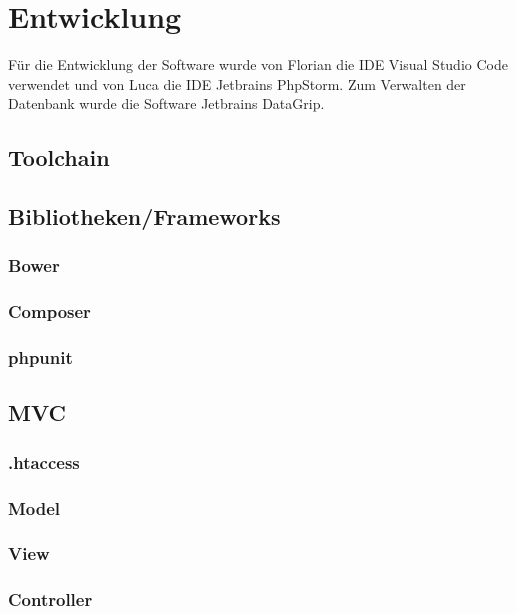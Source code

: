\chapter{Entwicklung}\label{ch:entwicklung}
Für die Entwicklung der Software wurde von Florian die IDE Visual Studio Code verwendet und von Luca die IDE Jetbrains PhpStorm.
Zum Verwalten der Datenbank wurde die Software Jetbrains DataGrip.

\section{Toolchain}\label{sec:toolchain}

\section{Bibliotheken/Frameworks}\label{sec:bibliotheken/frameworks}
\subsection{Bower}\label{subsec:bower}
\subsection{Composer}\label{subsec:composer}
\subsection{phpunit}\label{subsec:phpunit}

\section{MVC}\label{sec:mvc}
\subsection{.htaccess}\label{subsec:.htaccess}
\subsection{Model}\label{subsec:model}
\subsection{View}\label{subsec:view}
\subsection{Controller}

